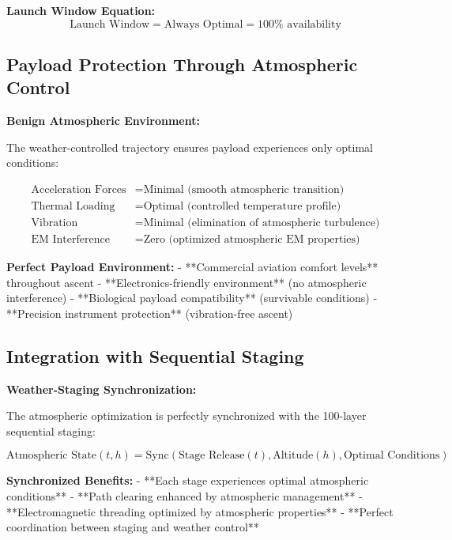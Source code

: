 \documentclass[12pt,a4paper]{article}
\begin{document}
\textbf{Launch Window Equation:}
\begin{equation}
\text{Launch Window} = \text{Always Optimal} = 100\% \text{ availability}
\end{equation}

\subsection{Payload Protection Through Atmospheric Control}

\textbf{Benign Atmospheric Environment:}

The weather-controlled trajectory ensures payload experiences only optimal conditions:

\begin{align}
\text{Acceleration Forces} &= \text{Minimal} \text{ (smooth atmospheric transition)} \\
\text{Thermal Loading} &= \text{Optimal} \text{ (controlled temperature profile)} \\
\text{Vibration} &= \text{Minimal} \text{ (elimination of atmospheric turbulence)} \\
\text{EM Interference} &= \text{Zero} \text{ (optimized atmospheric EM properties)}
\end{align}

\textbf{Perfect Payload Environment:}
- **Commercial aviation comfort levels** throughout ascent
- **Electronics-friendly environment** (no atmospheric interference)
- **Biological payload compatibility** (survivable conditions)
- **Precision instrument protection** (vibration-free ascent)

\subsection{Integration with Sequential Staging}

\textbf{Weather-Staging Synchronization:}

The atmospheric optimization is perfectly synchronized with the 100-layer sequential staging:

\begin{equation}
\text{Atmospheric State}(t,h) = \text{Sync}(\text{Stage Release}(t), \text{Altitude}(h), \text{Optimal Conditions})
\end{equation}

\textbf{Synchronized Benefits:}
- **Each stage experiences optimal atmospheric conditions**
- **Path clearing enhanced by atmospheric management**
- **Electromagnetic threading optimized by atmospheric properties**
- **Perfect coordination between staging and weather control**
\end{document}
